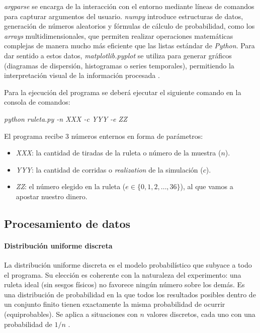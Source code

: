 \documentclass{article}
\begin{document}
\textit{argparse} se encarga de la interacción con el entorno mediante líneas de comandos para capturar argumentos del usuario.
\textit{numpy} introduce estructuras de datos, generación de números aleatorios y fórmulas de cálculo de probabilidad, como los \textit{arrays} 
multidimensionales, que permiten realizar operaciones matemáticas complejas de manera mucho más eficiente que 
las listas estándar de \textit{Python}. 
Para dar sentido a estos datos, \textit{matplotlib.pyplot} se utiliza para generar gráficos (diagramas de dispersión, 
histogramas o series temporales), permitiendo la interpretación visual de la información procesada \cite{python_para_impacientes_graficos,probabilidad_estadistica_python}.

Para la ejecución del programa se deberá ejecutar el siguiente comando en la consola de comandos: 
\begin{center}
  \textit{python ruleta.py -n XXX -c YYY -e ZZ}
\end{center}

El programa recibe 3 números enternos en forma de parámetros:
\begin{itemize}
  \item \textit{XXX}: la cantidad de tiradas de la ruleta o número de la muestra ($n$).
  \item \textit{YYY}: la cantidad de corridas o \textit{realization} de la simulación ($c$).
  \item \textit{ZZ}: el número elegido en la ruleta ($e\in\{0,1,2,\dots,36\}$), al que vamos a apostar nuestro dinero.
\end{itemize}

\subsection{Procesamiento de datos}

\paragraph{Distribución uniforme discreta}
La distribución uniforme discreta es el modelo probabilístico que subyace a todo el programa. Su elección es coherente con 
la naturaleza del experimento: una ruleta ideal (sin sesgos físicos) no favorece ningún número sobre los demás. Es una 
distribución de probabilidad en la que todos los resultados posibles dentro de un conjunto finito tienen exactamente la misma 
probabilidad de ocurrir (equiprobables). Se aplica a situaciones con $n$ valores discretos, cada uno con una probabilidad de $1/n$ \cite{distribucion_uniforme_discreta}.
\end{document}
